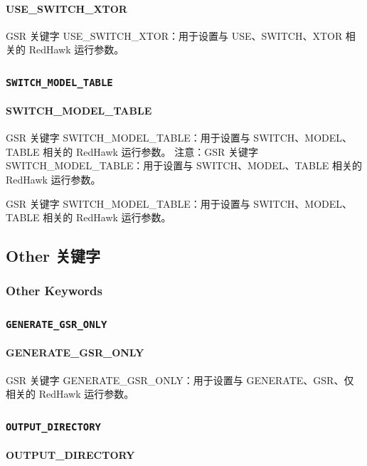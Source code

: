 \paragraph*{USE_SWITCH_XTOR}

GSR 关键字 USE_SWITCH_XTOR：用于设置与 USE、SWITCH、XTOR 相关的 RedHawk 运行参数。

\subsubsection{\texttt{SWITCH_MODEL_TABLE}}
\paragraph*{SWITCH_MODEL_TABLE}

GSR 关键字 SWITCH_MODEL_TABLE：用于设置与 SWITCH、MODEL、TABLE 相关的 RedHawk 运行参数。 注意：GSR 关键字 SWITCH_MODEL_TABLE：用于设置与 SWITCH、MODEL、TABLE 相关的 RedHawk 运行参数。

\begin{noteBox}
GSR 关键字 SWITCH\_MODEL\_TABLE：用于设置与 SWITCH、MODEL、TABLE 相关的 RedHawk 运行参数。
\end{noteBox}

\subsection{Other 关键字}
\subsubsection*{Other Keywords}

\subsubsection{\texttt{GENERATE_GSR_ONLY}}
\paragraph*{GENERATE_GSR_ONLY}

GSR 关键字 GENERATE_GSR_ONLY：用于设置与 GENERATE、GSR、仅 相关的 RedHawk 运行参数。

\subsubsection{\texttt{OUTPUT_DIRECTORY}}
\paragraph*{OUTPUT_DIRECTORY}

